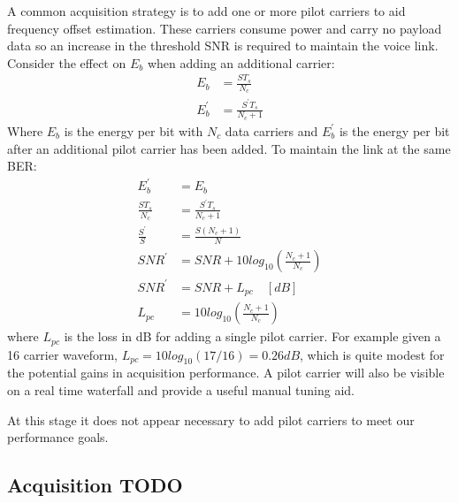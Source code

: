 \documentclass{article}
\begin{document}
A common acquisition strategy is to add one or more pilot carriers to aid frequency offset estimation. These carriers consume power and carry no payload data so an increase in the threshold SNR is required to maintain the voice link. Consider the effect on $E_b$ when adding an additional carrier:
\begin{equation}
\begin{split}
E_b &= \frac{ST_s}{N_c} \\
E^\prime_b &= \frac{S^\prime T_s}{N_c+1}
\end{split}
\end{equation}
Where $E_b$ is the energy per bit with $N_c$ data carriers and $E^\prime_b$ is the energy per bit after an additional pilot carrier has been added.  To maintain the link at the same BER:
\begin{equation}
\begin{split}
E^\prime_b &= E_b \\
\frac{S T_s}{N_c} &= \frac{S^\prime T_s} {N_c+1} \\
\frac{S^\prime}{S} &= \frac{S (N_c+1)}{N} \\
SNR^\prime &= SNR + 10log_{10}\left(\frac{N_c+1}{N_c}\right)  \\
SNR^\prime &= SNR + L_{pc}  \quad [\si{dB}] \\
L_{pc} &= 10log_{10}\left(\frac{N_c+1}{N_c}\right) 
\end{split}
\end{equation}
where $L_{pc}$ is the loss in dB for adding a single pilot carrier.  For example given a 16 carrier waveform, $L_{pc}=10log_{10}(17/16)=0.26 \si{dB}$, which is quite modest for the potential gains in acquisition performance.  A pilot carrier will also be visible on a real time waterfall and provide a useful manual tuning aid.

At this stage it does not appear necessary to add pilot carriers to meet our performance goals.

\subsection{Acquisition TODO}
\end{document}
